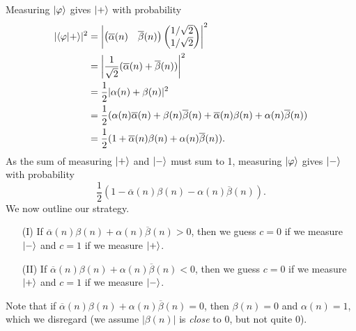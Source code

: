\begin{parts}
\begin{solution}
        Measuring $\ket\varphi$ gives $\ket+$ with probability
        \begin{align*}
            \lvert\braket{\varphi|+}\rvert^2
             & =
            \left\lvert
            \begin{pmatrix}
                \overline\alpha(n) & \overline\beta(n)
            \end{pmatrix}
            \begin{pmatrix}
                1/\sqrt2 \\ 1/\sqrt2
            \end{pmatrix}
            \right\rvert^2
            \\
             & = \left\lvert\frac{1}{\sqrt2}(\overline\alpha(n) + \overline\beta(n))\right\rvert^2                                          \\
             & = \frac12\lvert\alpha(n) + \beta(n)\rvert^2                                                                                  \\
             & = \frac12(\alpha(n)\overline\alpha(n) + \beta(n)\overline\beta(n) + \overline\alpha(n)\beta(n) + \alpha(n)\overline\beta(n)) \\
             & = \frac12(1 + \overline\alpha(n)\beta(n) + \alpha(n)\overline\beta(n)).
        \end{align*}
        As the sum of measuring $\ket+$ and $\ket-$ must sum to 1, measuring $\ket\varphi$ gives $\ket-$ with probability
        \[ \frac12(1 - \overline\alpha(n)\beta(n) - \alpha(n)\overline\beta(n)). \]
        We now outline our strategy.
        \begin{enumerate}
            \item[(I)] If $\overline\alpha(n)\beta(n) + \alpha(n)\overline\beta(n) > 0$, then we guess $c = 0$ if we measure $\ket-$ and $c = 1$ if we measure $\ket+$.
            \item[(II)] If $\overline\alpha(n)\beta(n) + \alpha(n)\overline\beta(n) < 0$, then we guess $c = 0$ if we measure $\ket+$ and $c = 1$ if we measure $\ket-$.
        \end{enumerate}
        Note that if $\overline\alpha(n)\beta(n) + \alpha(n)\overline\beta(n) = 0$, then $\beta(n) = 0$ and $\alpha(n) = 1$, which we disregard (we assume $\lvert \beta(n) \rvert$ is \emph{close} to $0$, but not quite $0$).


\end{solution}
\end{parts}
